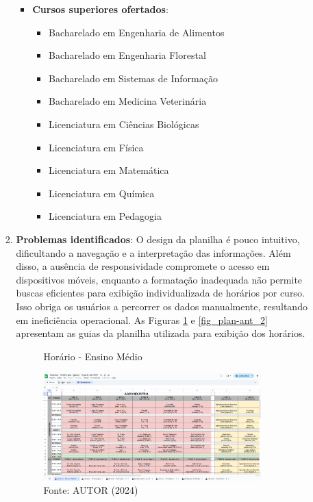 \begin{itemize}
\begin{itemize}
\begin{enumerate}
\begin{itemize}
                \item \textbf{Cursos superiores ofertados}:
                \begin{itemize}
                    \item Bacharelado em Engenharia de Alimentos
                    \item Bacharelado em Engenharia Florestal
                    \item Bacharelado em Sistemas de Informação
                    \item Bacharelado em Medicina Veterinária
                    \item Licenciatura em Ciências Biológicas
                    \item Licenciatura em Física
                    \item Licenciatura em Matemática
                    \item Licenciatura em Química
                    \item Licenciatura em Pedagogia
                \end{itemize}
            \end{itemize}
            \item \textbf{Problemas identificados}: O design da planilha é pouco intuitivo, dificultando a navegação e a interpretação das informações. Além disso, a ausência de responsividade compromete o acesso em dispositivos móveis, enquanto a formatação inadequada não permite buscas eficientes para exibição individualizada de horários por curso. Isso obriga os usuários a percorrer os dados manualmente, resultando em ineficiência operacional. As Figuras \ref{fig_plan-ant_1} e \ref{fig_plan-ant_2} apresentam as guias da planilha utilizada para exibição dos horários.

            \begin{figure}[htb]
                \centering
                \caption{Horário - Ensino Médio}
                \includegraphics[width=0.9\textwidth]{Figuras/plan-ant-1.png}
                \caption*{Fonte: AUTOR (2024)}
                \label{fig_plan-ant_1}
            \end{figure}


\end{enumerate}
\end{itemize}
\end{itemize}
